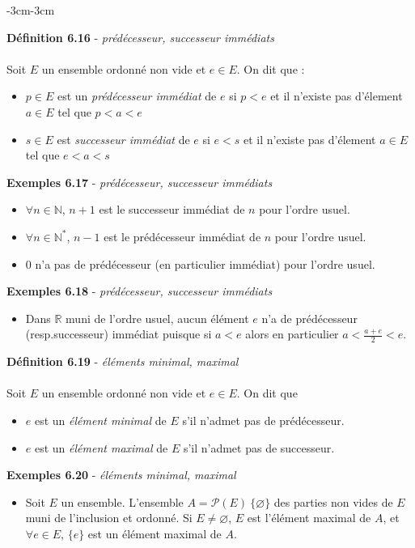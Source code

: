\documentclass{article}
\newcommand{\notion}[1]{\textcolor{vert_fonce}{\textit{#1}}}
\newenvironment{definition}[2]
{
    \begin{boite_definition}
    \textbf{\textcolor{rouge_fonce}{Définition #1}} - \textit{#2} \\ \\
}
{
    \end{boite_definition}
    \vspace{15pt}
}
\newenvironment{exemples}[2]
{
    \begin{boite_exemples}
    \textbf{\textcolor{bleu_fonce}{Exemples #1}} - \textit{#2} \\
    \begin{itemize}[label=$\blacktriangleright \quad $]                    
}
{   
    \end{itemize}
    \end{boite_exemples}
    \vspace{15pt}
}
\begin{document}
\begin{adjustwidth}{-3cm}{-3cm}

\begin{definition}{6.16}{prédécesseur, successeur immédiats}
Soit $E$ un ensemble ordonné non vide et $e \in E$. On dit que :
    \begin{itemize}
        \item $p \in E$ est un \notion{prédécesseur immédiat} de $e$ si $p<e$ et il n'existe pas d'élement $a\in E$ tel que $p<a<e$
        \item $s \in E$ est \notion{successeur  immédiat} de $e$ si $e<s$ et il n'existe pas d'élement $a\in E$ tel que $e<a<s$
    \end{itemize}
\end{definition}

\begin{exemples}{6.17}{prédécesseur, successeur immédiats}
    \item $\forall n \in \mathbb{N}$, $n+1$ est le successeur immédiat de $n$ pour l'ordre usuel.
    \item $\forall n \in \mathbb{N}^*$, $n-1$ est le prédécesseur immédiat de $n$ pour l'ordre usuel.
    \item $0$ n'a pas de prédécesseur (en particulier immédiat) pour l'ordre usuel.
\end{exemples}


\begin{exemples}{6.18}{prédécesseur, successeur immédiats}
    \item Dans $\mathbb{R}$ muni de l'ordre usuel, aucun élément $e$ n'a de prédécesseur (resp.successeur) immédiat puisque si $a<e$ alors en particulier $a<\frac{a+e}{2}<e$.
\end{exemples}


\begin{definition}{6.19}{éléments minimal, maximal}
    Soit $E$ un ensemble ordonné non vide et $e \in E$. On dit que \begin{itemize}
        \item $e$ est un \notion{élément minimal} de $E$ s'il n'admet pas de prédécesseur.
        \item $e$ est un \notion{élément maximal} de $E$ s'il n'admet pas de successeur.
    \end{itemize}

\end{definition}

\begin{exemples}{6.20}{éléments minimal, maximal}
    \item Soit $E$ un ensemble. L'ensemble $A = \mathcal{P}(E) \ \{\varnothing\}$ des parties non vides de $E$ muni de l'inclusion et ordonné. Si $E \neq \varnothing$, $E$ est l'élément maximal de $A$, et $\forall e \in E$, $\{e\}$ est un élément maximal de $A$.
\end{exemples}


\end{adjustwidth}
\end{document}
